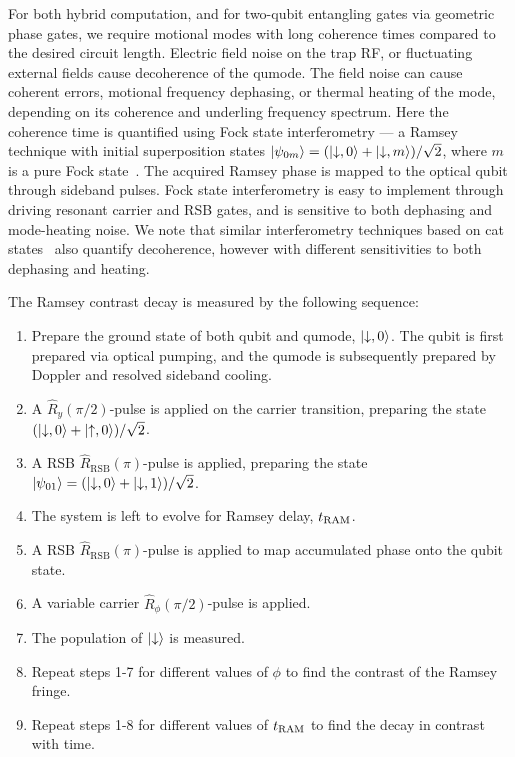     For both hybrid computation, and for two-qubit entangling gates via
    geometric phase gates, we require motional modes with long coherence times
    compared to the desired circuit length. Electric field noise on the trap RF,
    or fluctuating external fields cause decoherence of the qumode. The field
    noise can cause coherent errors, motional frequency dephasing, or thermal heating of
    the mode, depending on its coherence and underling frequency spectrum.
    Here the coherence time is quantified
    using Fock state interferometry --- a Ramsey technique with initial superposition states $\ket{\psi_{0m}}=(\ket{\downarrow, 0}+\ket{\downarrow, m})/\sqrt{2}$, where $m$ is a pure Fock state~\cite{turchette_decoherence_2000}. The acquired Ramsey phase is mapped to the optical qubit through sideband pulses. Fock state interferometry is
    easy to implement through driving resonant carrier and RSB gates, and is sensitive to both dephasing
    and mode-heating noise. We note that similar interferometry
    techniques based on cat states~\cite{monroe_schrodinger_1996} also 
    quantify decoherence, however with different
    sensitivities to both dephasing and heating. 

    The Ramsey contrast decay is measured by the following sequence:
    \begin{enumerate}
    \item Prepare the ground state of both qubit and qumode, $\ket{\downarrow, 0}$. The qubit is first prepared via optical pumping, and the qumode is subsequently prepared by Doppler and resolved sideband cooling.
    \item A $\hat R_y(\pi/2)$-pulse is applied on the carrier transition, preparing the state $(\ket{\downarrow, 0} + \ket{\uparrow, 0})/\sqrt{2}$.
    \item A RSB $\hat R_\mathrm{RSB}(\pi)$-pulse is applied, preparing the state $\ket{\psi_{01}}=(\ket{\downarrow, 0} + \ket{\downarrow, 1})/\sqrt{2}$.
    \item The system is left to evolve for Ramsey delay, $t_{\rm RAM}$.
    \item A RSB $\hat R_\mathrm{RSB}(\pi)$-pulse is applied to map accumulated phase onto the qubit state.
    \item A variable carrier $\hat R_\phi(\pi/2)$-pulse is applied.
    \item The population of $\ket{\downarrow}$ is measured.
    \item Repeat steps 1-7 for different values of $\phi$ to find the contrast of the Ramsey fringe.
    \item Repeat steps 1-8 for different values of $t_{\rm RAM}$ to find the decay in contrast with time.
    \end{enumerate}

